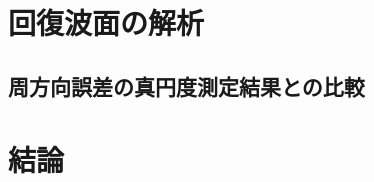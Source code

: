 \clearpage
\newpage

\section{回復波面の解析}
\subsection{周方向誤差の真円度測定結果との比較}

\section{結論}
\label{chap5_conclusion}



